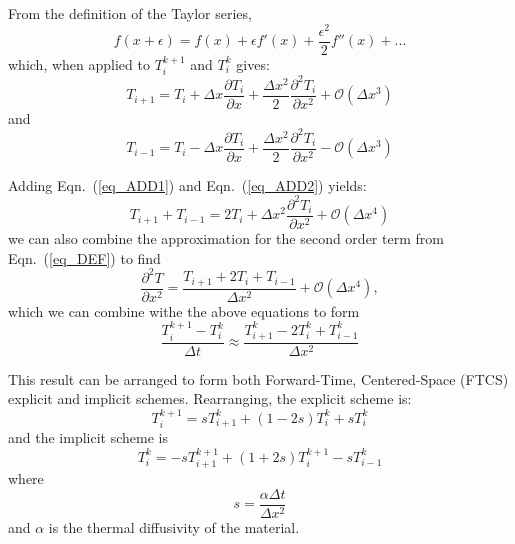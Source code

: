 \documentclass[twocolumn,10pt]{asme2ej}
\begin{document}
From the definition of the Taylor series,
\begin{equation}
f(x+\epsilon) = f(x) + \epsilon f'(x) + \frac{\epsilon^2}{2} f''(x) + ...
\end{equation}
\noindent which, when applied to $T_{i}^{k+1}$  and $T_{i}^{k}$ gives:
\begin{equation}
T_{i+1} = T_i + \Delta x \frac{\partial T_i}{\partial x} + \frac{\Delta x^2}{2} \frac{\partial^2 T_i}{\partial x^2} + \mathcal{O}(\Delta x^3)
\label{eq_ADD1}
\end{equation}
\noindent and
\begin{equation}
T_{i-1} = T_i - \Delta x \frac{\partial T_i}{\partial x} + \frac{\Delta x^2}{2} \frac{\partial^2 T_i}{\partial x^2} - \mathcal{O}(\Delta x^3)
\label{eq_ADD2}
\end{equation}

Adding Eqn.~(\ref{eq_ADD1}) and Eqn.~(\ref{eq_ADD2}) yields:
\begin{equation}
T_{i+1} + T_{i-1} = 2T_i + \Delta x^2 \frac{\partial^2 T_i}{\partial x^2} + \mathcal{O}(\Delta x^4)
\end{equation}
\noindent we can also combine the approximation for the second order term from Eqn.~(\ref{eq_DEF}) to find
\begin{equation}
\frac{\partial^2 T}{\partial x^2} = \frac{T_{i+1} + 2T_{i} + T_{i-1}}{\Delta x^2} + \mathcal{O}(\Delta x^4),
\end{equation}
\noindent which we can combine withe the above equations to form
\begin{equation}
\frac{T_i^{k+1}-T_i^k}{\Delta t} \approx \frac{T_{i+1}^k - 2T_i^k + T_{i-1}^k}{\Delta x^2}
\end{equation}

This result can be arranged to form both Forward-Time, Centered-Space (FTCS) explicit and implicit schemes. Rearranging, the explicit scheme is:
\begin{equation}
T_i^{k+1} = sT_{i+1}^k +(1- 2s)T_i^k + sT_{i}^k
\end{equation}
\noindent and the implicit scheme is
\begin{equation}
T_i^k = -sT_{i+1}^{k+1} +(1+2s)T_i^{k+1} - sT_{i-1}^k
\end{equation}
\noindent where
\begin{equation}
s = \frac{\alpha \Delta t}{\Delta x^2}
\end{equation}
\noindent and $\alpha$ is the thermal diffusivity of the material.

\end{document}
